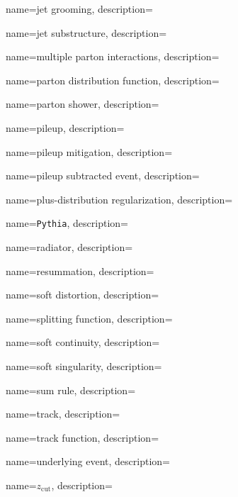 {
  name=jet grooming,
  description={}
}


{
  name=jet substructure,
  description={}
}


{
  name=multiple parton interactions,
  description={}
}



{
  name=parton distribution function,
  description={}
}

{
  name=parton shower,
  description={}
}

{
  name=pileup,
  description={}
}

{
  name=pileup mitigation,
  description={}
}

{
  name=pileup subtracted event,
  description={}
}

{
  name=plus-distribution regularization,
  description={}
}

{
  name=\texttt{Pythia},
  description={}
}

{
  name=radiator,
  description={}
}

{
  name=resummation,
  description={}
}

{
  name=soft distortion,
  description={}
}

{
  name=splitting function,
  description={}
}

{
  name=soft continuity,
  description={}
}

{
  name=soft singularity,
  description={}
}


{
  name=sum rule,
  description={}
}

{
  name=track,
  description={}
}

{
  name=track function,
  description={}
}

{
  name=underlying event,
  description={}
}




{
  name=\ensuremath{z_{\text{cut}}},
  description={}
}

